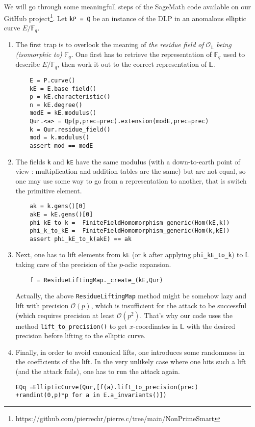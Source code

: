 \documentclass[10pt]{article}
\theoremstyle{definition}
\newcommand{\F}{\mathbb{F}}
\renewcommand{\L}{\mathbb{L}}
\begin{document}
We will go through some meaningfull steps of the SageMath code available on our GitHub project\footnote{https://github.com/pierrechr/pierre.c/tree/main/NonPrimeSmart}.
Let \verb|kP = Q| be an instance of the DLP in an anomalous elliptic curve $E/\F_q$.
\begin{enumerate}
\item  The first trap is to overlook the meaning of \textsl{ the residue field of } $\mathcal{O}_{\L}$ \textsl{being (isomorphic to)} $\F_q$.
One first has to retrieve the representation of $\F_q$ used to describe $E/\F_q$, then work it out to the correct representation of $\L$.

\begin{verbatim}
    E = P.curve()
    kE = E.base_field()
    p = kE.characteristic()
    n = kE.degree()
    modE = kE.modulus()
    Qur.<a> = Qp(p,prec=prec).extension(modE,prec=prec)
    k = Qur.residue_field()
    mod = k.modulus()
    assert mod == modE
\end{verbatim}

\item The fields \verb|k|  and \verb|kE| have the same modulus (with a down-to-earth point of view : multiplication and addition tables are the same) but are not equal, so one may use some way to go from a representation to another, that is switch the primitive element. 

\begin{verbatim}
    ak = k.gens()[0]
    akE = kE.gens()[0]
    phi_kE_to_k =  FiniteFieldHomomorphism_generic(Hom(kE,k))
    phi_k_to_kE =  FiniteFieldHomomorphism_generic(Hom(k,kE))
    assert phi_kE_to_k(akE) == ak
\end{verbatim}


\item Next, one has to lift elements from \verb|kE| (or \verb|k| after applying \verb|phi_kE_to_k|) to $\L$ taking care of the precision of the $p$-adic expansion.

\begin{verbatim}
    f = ResidueLiftingMap._create_(kE,Qur)
\end{verbatim}

Actually, the above \verb|ResidueLiftingMap| method might be somehow lazy and lift with precision $\mathcal{O}(p)$, which is insufficient for the attack to be successful (which requires precision at least $\mathcal{O}(p^2)$.
That's why our code uses the method \verb|lift_to_precision()| to get $x$-coordinates in $\L$ with the desired precision before lifting to the elliptic curve.

\item Finally, in order to avoid canonical lifts, one introduces some randomness in the coefficients of the lift.
In the very unlikely case where one hits such a lift (and the attack fails), one has to run the attack again.

\begin{verbatim}
EQq =EllipticCurve(Qur,[f(a).lift_to_precision(prec) +randint(0,p)*p for a in E.a_invariants()])
\end{verbatim}
\end{enumerate}
\end{document}
